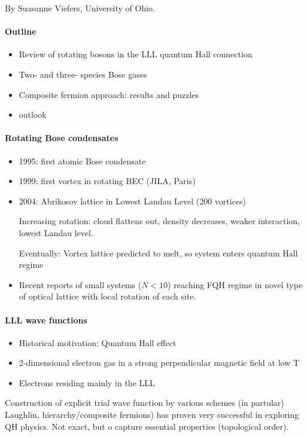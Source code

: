 \documentclass{article}
\numberwithin{equation}{subsection} %
\theoremstyle{definition}
\begin{document}
By Suasanne Viefers, University of Ohio.
\paragraph{Outline}
\begin{itemize}
    \item Review of rotating bosons in the LLL quantum Hall connection
    \item Two- and three- species Bose gases
    \item Composite fermion approach: results and puzzles
    \item outlook
\end{itemize}

\paragraph{Rotating Bose condensates}
\begin{itemize}
    \item 1995: first atomic Bose condensate
    \item 1999: first vortex in rotating BEC (JILA, Paris)
    \item 2004: Abrikosov lattice in Lowest Landau Level (200 vortices)

        Increasing rotation: cloud flattens out, density decreases, weaker
        interaction, lowest Landau level.

        Eventually: Vortex lattice predicted to melt, so system enters
        quantum Hall regime
    \item Recent reports of small systems ($N<10$) reaching FQH regime in
        novel type of optical lattice with local rotation of each site.
\end{itemize}

\paragraph{LLL wave functions}
\begin{itemize}
    \item Historical motivation: Quantum Hall effect
    \item 2-dimensional electron gas in a strong perpendicular magnetic
        field at low T
    \item Electrons residing mainly in the LLL
\end{itemize}

Construction of explicit trial wave function by various schemes (in
partular) Laughlin, hierarchy/composite fermions) has proven very
successful in exploring QH physics. Not exact, but o capture essential
properties (topological order).
\end{document}
